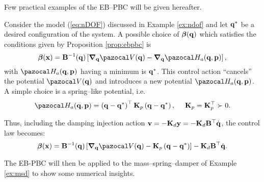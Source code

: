 Few practical examples of the EB--PBC will be given hereafter.
%
\begin{exmp}
    Consider the model (\ref{eq:nDOF}) discussed in Example \ref{ex:ndof} and let $\mathbf{q}^*$ be a desired configuration of the system. A possible choice of $\bm\beta(\mathbf{q})$ which satisfies the conditions given by Proposition \ref{prop:ebpbc} is
    \begin{equation}
        \bm\beta(\xb) = \mathbf{B}^{-1}(\qb)\left[\bm\nabla_{\qb}\V(\q) - \bm\nabla_\qb\Ha_a(\qb,\pb)\right],
    \end{equation}
    with $\Ha_a(\qb,\pb)$ having a minimum is $\mathbf{q}^*$. This control action ``cancels'' the potential $\V(\qb)$ and introduces a new potential $\Ha_a(\qb,\pb)$. A simple choice is a spring--like potential, i.e.
    \begin{equation}
        \Ha_a(\qb,\pb) = \left(\qb-\qb^*\right)^\top\mathbf{K}_p\left(\qb-\qb^*\right),~~~~\mathbf{K}_p = \mathbf{K}_p^\top\succ 0.
    \end{equation}
    
    Thus, including the damping injection action $\mathbf{v} = -\mathbf{K}_d\mathbf{y} =-\mathbf{K}_d\mathbf{B}^\top\dot{\mathbf{q}}$, the control law becomes:
    \begin{equation}
        \bm\beta(\xb) = \mathbf{B}^{-1}(\qb)\left[\bm\nabla_{\qb}\V(\q) - \mathbf{K}_p\left(\qb-\qb^*\right)\right] - \mathbf{K}_d\mathbf{B}^\top\dot{\qb}.
    \end{equation}
\end{exmp}
%
The EB-PBC will then be applied to the mass--spring--damper of Example \ref{ex:msd} to show some numerical insights. 
%
